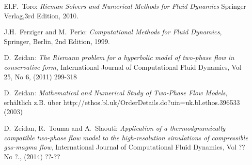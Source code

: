 \begin{thebibliography}{9}

 El.F.~Toro: {\it Rieman Solvers and Numerical Methods
  for Fluid Dynamics} Springer Verlag,3rd Edition, 2010.

 J.H.~Ferziger and M.~Peric: {\it Computational Methods for
  Fluid Dynamics}, Springer, Berlin, 2nd Edition, 1999.

 D.~Zeidan: {\it The Riemann problem for a
  hyperbolic model of two-phase flow in conservative form},
  International Journal of Computational Fluid Dynamics, Vol 25, No 6,
  (2011) 299-318

 D.~Zeidan: {\it Mathematical and Numerical Study of
  Two-Phase Flow Models}, erhältlich z.B. über
  http://ethos.bl.uk/OrderDetails.do?uin=uk.bl.ethos.396533 (2003)

 D.~Zeidan, R.~Touma and A.~Slaouti: {\it
  Application of a thermodynamically compatible two-phase flow model
  to the high-resolution simulations of compressible gas-magma flow},
  International Journal of Computational Fluid Dynamics, Vol ?? No ?.,
  (2014) ??-??

\end{thebibliography}

